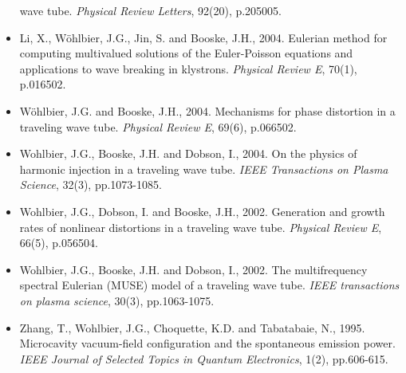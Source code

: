 \documentclass{muratcan_cv}
\begin{document}
\begin{itemize}
  wave tube. {\it Physical Review Letters}, 92(20), p.205005.
\item Li, X., Wöhlbier, J.G., Jin, S. and Booske, J.H., 2004. Eulerian
  method for computing multivalued solutions of the Euler-Poisson
  equations and applications to wave breaking in klystrons. {\it Physical
  Review E}, 70(1), p.016502.
\item Wöhlbier, J.G. and Booske, J.H., 2004. Mechanisms for phase
  distortion in a traveling wave tube. {\it Physical Review E}, 69(6),
  p.066502.
\item Wohlbier, J.G., Booske, J.H. and Dobson, I., 2004. On the
  physics of harmonic injection in a traveling wave tube. {\it IEEE
  Transactions on Plasma Science}, 32(3), pp.1073-1085.
\item Wohlbier, J.G., Dobson, I. and Booske, J.H., 2002. Generation
  and growth rates of nonlinear distortions in a traveling wave
  tube. {\it Physical Review E}, 66(5), p.056504.
\item Wohlbier, J.G., Booske, J.H. and Dobson, I., 2002. The
  multifrequency spectral Eulerian (MUSE) model of a traveling wave
  tube. {\it IEEE transactions on plasma science}, 30(3), pp.1063-1075.
\item Zhang, T., Wohlbier, J.G., Choquette, K.D. and Tabatabaie, N.,
  1995. Microcavity vacuum-field configuration and the spontaneous
  emission power. {\it IEEE Journal of Selected Topics in Quantum
  Electronics}, 1(2), pp.606-615.
\end{itemize}

%
%
%
\end{document}
